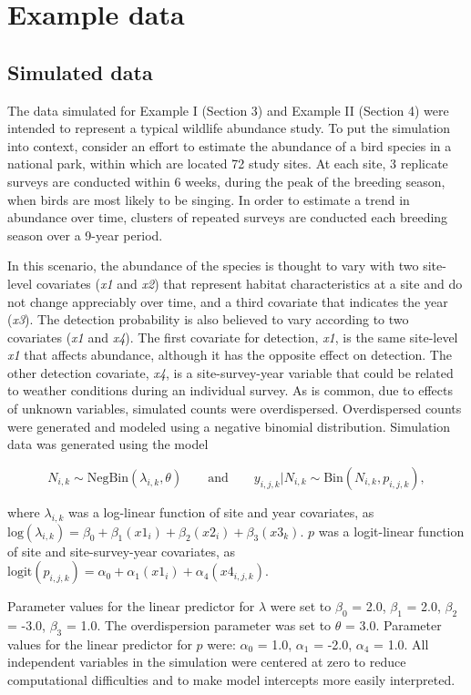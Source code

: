 \documentclass[codesnippet]{jss}
\begin{document}
\section[Example data]{Example data}
\subsection[Simulated data]{Simulated data}
The data simulated for Example I (Section 3) and Example II (Section 4) were intended to represent a typical wildlife abundance study. To put the simulation into context, consider an effort to estimate the abundance of a bird species in a national park, within which are located 72 study sites. At each site, 3 replicate surveys are conducted within 6 weeks, during the peak of the breeding season, when birds are most likely to be singing. In order to estimate a trend in abundance over time, clusters of repeated surveys are conducted each breeding season over a 9-year period.

In this scenario, the abundance of the species is thought to vary with two site-level covariates (\textit{x1} and \textit{x2}) that represent habitat characteristics at a site and do not change appreciably over time, and a third covariate that indicates the year (\textit{x3}). The detection probability is also believed to vary according to two covariates (\textit{x1} and \textit{x4}). The first covariate for detection, \textit{x1}, is the same site-level \textit{x1} that affects abundance, although it has the opposite effect on detection. The other detection covariate, \textit{x4}, is a site-survey-year variable that could be related to weather conditions during an individual survey. As is common, due to effects of unknown variables, simulated counts were overdispersed. Overdispersed counts were generated and modeled using a negative binomial distribution. Simulation data was generated using the model

$$N_{i,k} \sim \text{NegBin}(\lambda_{i,k}, \theta) \qquad \text{and} \qquad  y_{i,j,k} | N_{i,k} \sim \text{Bin}(N_{i,k}, p_{i,j,k}),$$

where $\lambda_{i,k}$ was a log-linear function of site and year covariates, as $\text{log}(\lambda_{i,k}) = \beta_0 + \beta_1 (\textit{x1}_{i}) + \beta_2 (\textit{x2}_{i}) + \beta_3 (\textit{x3}_{k})$. $p$ was a logit-linear function of site and site-survey-year covariates, as $\text{logit}(p_{i,j,k}) = \alpha_0 + \alpha_1 (\textit{x1}_{i}) + \alpha_4 (\textit{x4}_{i,j,k})$.

Parameter values for the linear predictor for $\lambda$ were set to $\beta_0$ = 2.0, $\beta_1$ = 2.0, $\beta_2$ = -3.0, $\beta_3$ = 1.0. The overdispersion parameter was set to $\theta$ = 3.0. Parameter values for the linear predictor for $p$ were: $\alpha_0$ = 1.0, $\alpha_1$ = -2.0, $\alpha_4$ = 1.0. All independent variables in the simulation were centered at zero to reduce computational difficulties and to make model intercepts more easily interpreted.
\end{document}

